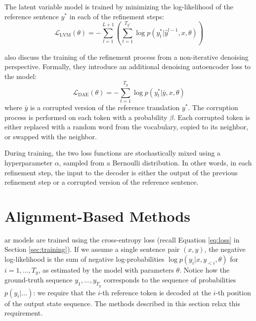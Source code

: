 The latent variable model is trained by minimizing the log-likelihood of the
reference sentence $y^*$ in each of the refinement steps:
\begin{equation}
  \mathcal{L}_{\text{LVM}}(\theta) = - \sum_{l=1}^{L+1} \left(
    \sum_{t=1}^{T_{y^*}} \log p(y_t^* | \hat{y}^{l-1}, x, \theta)
  \right) \label{eq:refinement-lvm-loss}
\end{equation}

\citet{lee-etal-2018-deterministic} also discuss the training of the refinement
process from a non-iterative denoising perspective. Formally, they introduce an
additional denoising autoencoder loss to the model:
%
\begin{equation}
  \mathcal{L}_{\text{DAE}}(\theta) = - \sum_{t=1}^{T_y} \log p(y_t^* | \bar{y}, x, \theta)
\end{equation}
where $\bar{y}$ is a corrupted version of the reference translation $y^*$. The
corruption process is performed on each token with a probability $\beta$. Each
corrupted token is either replaced with a random word from the vocabulary,
copied to its neighbor, or swapped with the neighbor.

During training, the two loss functions are stochastically mixed using a
hyperparameter $\alpha$, sampled from a Bernoulli distribution. In other words,
in each refinement step, the input to the decoder is either the output of the
previous refinement step or a corrupted version of the reference sentence.

\section{Alignment-Based Methods}%
\label{sec:nat:alignment}

\Acl{ar} models are trained using the cross-entropy loss (recall Equation
\ref{eq:loss} in Section \ref{sec:training}). If we assume a single sentence
pair $(x,y)$, the negative log-likelihood is the sum of negative
log-probabilities $\log p(y_i|x, y_{<i}, \theta)$ for $i=1, \ldots, T_y$, as
estimated by the model with parameters $\theta$.  Notice how the ground-truth
sequence $y_1, \ldots, y_{T_y}$ corresponds to the sequence of probabilities
$p(y_i|\ldots)$: we require that the $i$-th reference token is decoded at the
$i$-th position of the output state sequence. The methods described in this
section relax this requirement.

